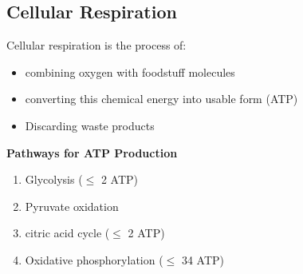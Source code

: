 \documentclass[11pt,fleqn]{book}
\begin{document}
\subsection{Cellular Respiration}
Cellular respiration is the process of:
\begin{itemize}
    \item combining oxygen with foodstuff molecules
    \item converting this chemical energy into usable form (ATP)
    \item Discarding waste products
\end{itemize}
\textbf{Pathways for ATP Production}
\begin{enumerate}
    \item Glycolysis ($\leq$ 2 ATP)
    \item Pyruvate oxidation
    \item citric acid cycle ($\leq$ 2 ATP)
    \item Oxidative phosphorylation ($\leq$ 34 ATP)
\end{enumerate}
\end{document}
